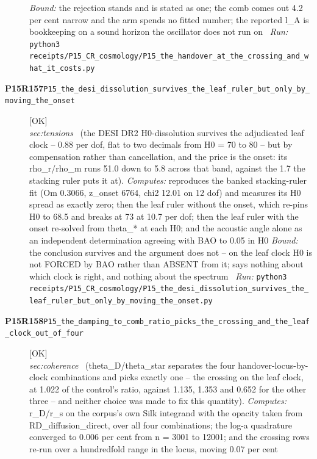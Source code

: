 \begin{description}
 \emph{Bound:} the rejection stands and is stated as one; the comb comes out 4.2 per cent narrow and the arm spends no fitted number; the reported l\_A is bookkeeping on a sound horizon the oscillator does not run on
\ \emph{Run:} \texttt{python3 receipts/P15\_CR\_cosmology/P15\_the\_handover\_at\_the\_crossing\_and\_what\_it\_costs.py}
\item[\rcptlabel{P15_the_desi_dissolution_survives_the_leaf_ruler_but_only_by_moving_the_onset}{P15R157}\textbf{P15R157}\quad\texttt{P15\_the\_desi\_dissolution\_survives\_the\_leaf\_ruler\_but\_only\_by\_moving\_the\_onset}]\hfill\textsf{[OK]}\\
\textit{sec:tensions} \ (the DESI DR2 H0-dissolution survives the adjudicated leaf clock -- 0.88 per dof, flat to two decimals from H0 = 70 to 80 -- but by compensation rather than cancellation, and the price is the onset: its rho\_r/rho\_m runs 51.0 down to 5.8 across that band, against the 1.7 the stacking ruler puts it at). 
\emph{Computes:} reproduces the banked stacking-ruler fit (Om 0.3066, z\_onset 6764, chi2 12.01 on 12 dof) and measures its H0 spread as exactly zero; then the leaf ruler without the onset, which re-pins H0 to 68.5 and breaks at 73 at 10.7 per dof; then the leaf ruler with the onset re-solved from theta\_* at each H0; and the acoustic angle alone as an independent determination agreeing with BAO to 0.05 in H0
 \emph{Bound:} the conclusion survives and the argument does not -- on the leaf clock H0 is not FORCED by BAO rather than ABSENT from it; says nothing about which clock is right, and nothing about the spectrum
\ \emph{Run:} \texttt{python3 receipts/P15\_CR\_cosmology/P15\_the\_desi\_dissolution\_survives\_the\_leaf\_ruler\_but\_only\_by\_moving\_the\_onset.py}
\item[\rcptlabel{P15_the_damping_to_comb_ratio_picks_the_crossing_and_the_leaf_clock_out_of_four}{P15R158}\textbf{P15R158}\quad\texttt{P15\_the\_damping\_to\_comb\_ratio\_picks\_the\_crossing\_and\_the\_leaf\_clock\_out\_of\_four}]\hfill\textsf{[OK]}\\
\textit{sec:coherence} \ (theta\_D/theta\_star separates the four handover-locus-by-clock combinations and picks exactly one -- the crossing on the leaf clock, at 1.022 of the control's ratio, against 1.135, 1.353 and 0.652 for the other three -- and neither choice was made to fix this quantity). 
\emph{Computes:} r\_D/r\_s on the corpus's own Silk integrand with the opacity taken from RD\_diffusion\_direct, over all four combinations; the log-a quadrature converged to 0.006 per cent from n = 3001 to 12001; and the crossing rows re-run over a hundredfold range in the locus, moving 0.07 per cent

\end{description}
